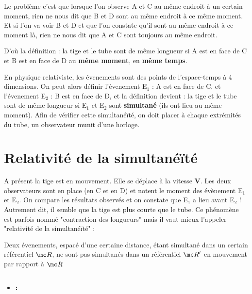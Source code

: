 
Le problème c'est que lorsque l'on observe A et C au même endroit à un certain moment, rien ne nous dit que B et D sont au même endroit à ce même moment. Et si l'on va voir B et D et que l'on constate qu'il sont au même endroit à ce moment là, rien ne nous dit que A et C sont toujours au même endroit.

D'où la définition : la tige et le tube sont de même longueur si A est en face de C et B est en face de D au {\bf même moment}, en {\bf même temps}.

En physique relativiste, les évenements sont des points de l'espace-temps à 4 dimensions.
On peut alors définir l'évenement E$_1$ : A est en face de C, et l'évenement E$_2$ : B est en face de D, et la définition devient : la tige et le tube sont de même longueur si E$_1$ et E$_2$ sont {\bf simultané} (ils ont lieu au même moment). Afin de vérifier cette simultanéïté, on doit placer à chaque extrémités du tube, un observateur munit d'une horloge.

\section{Relativité de la simultanéïté}

A présent la tige est en mouvement. Elle se déplace à la vitesse {\bf V}. Les deux observateurs sont en place (en C et en D) et notent le moment des évènement E$_1$ et E$_2$. On compare les résultats observés et on constate que E$_1$ a lieu avant E$_2$ ! Autrement dit, il semble que la tige est plus courte que le tube. Ce phénomène est parfois nommé "contraction des longueurs" mais il vaut mieux l'appeler "relativité de la simultanéïté" : 
\begin{center}
Deux évenements, espacé d'une certaine distance, étant simultané dans un certain référentiel ${\mc R}$, ne sont pas simultanés dans un référentiel ${\mc R'}$ en mouvement par rapport à ${\mc R}$
\end{center}


\subsection{}

\begin{itemize}[leftmargin=1cm, label=, itemsep=1pt]
\item {\bf :}
\end{itemize}

